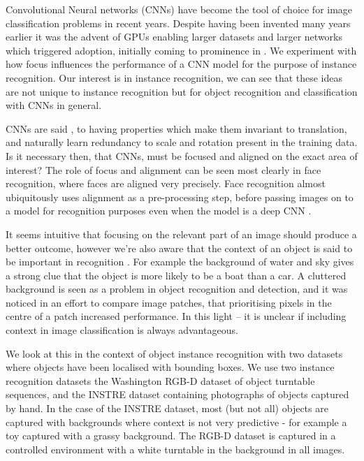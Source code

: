Convolutional Neural networks (\gls{CNN}s) \cite{LeCun1998} have become the tool of choice for image classification problems in recent years. Despite having been invented many years earlier it was the advent of GPUs enabling larger datasets and larger networks which triggered adoption, initially coming to prominence in \cite {Krizhevsky2012}.  We experiment with how focus influences the performance of a CNN model for the purpose of instance recognition. Our interest is in instance recognition, we can see that these ideas are not unique to instance recognition but for object recognition and classification with \gls{CNN}s in general.

\gls{CNN}s are said \cite{Krizhevsky2012}, to having properties which make them invariant to translation, and naturally learn redundancy to scale and rotation present in the training data. Is it necessary then, that \gls{CNN}s, must be focused and aligned on the exact area of interest? The role of focus and alignment can be seen most clearly in face recognition, where faces are aligned very precisely. Face recognition almost ubiquitously uses alignment as a pre-processing step, before passing images on to a model for recognition purposes even when the model is a deep CNN \cite{Taigman2014}.

It seems intuitive that focusing on the relevant part of an image should produce a better outcome, however we're also aware that the context of an object is said to be important in recognition \cite{Oliva2007}. For example the background of water and sky gives a strong clue that the object is more likely to be a boat than a car. A cluttered background is seen as a problem in object recognition and detection, and it was noticed in an effort to compare image patches, that prioritising pixels in the centre of a patch \cite{Zagoruyko2015} increased performance. In this light -- it is unclear if including context in image classification is always advantageous. 

We look at this in the context of object instance recognition with two datasets where objects have been localised with bounding boxes. We use two instance recognition datasets the Washington RGB-D dataset \cite{Lai2011} of object turntable sequences, and the INSTRE dataset \cite{Wang2015} containing photographs of objects captured by hand. In the case of the INSTRE dataset, most (but not all) objects are captured with backgrounds where context is not very predictive - for example a toy captured with a grassy background. The RGB-D dataset is captured in a controlled environment with a white turntable in the background in all images.

